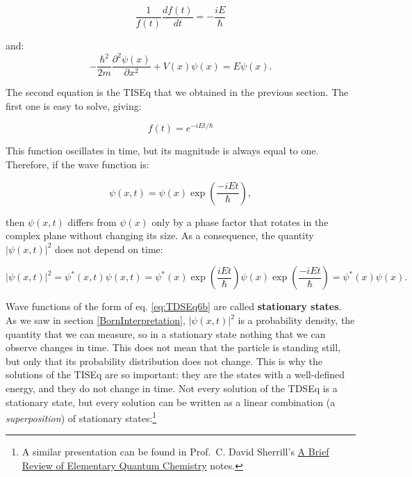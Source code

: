 \documentclass[
  english,
  9pt,
]{extbook}
\theoremstyle{definition}
\theoremstyle{definition}
\theoremstyle{definition}
\theoremstyle{definition}
\theoremstyle{remark}
\begin{document}
\begin{equation}
\frac{1}{f(t)} \frac{df(t)}{dt} = - \frac{i E}{\hbar}
\label{eq:TDSEq4}
\end{equation}

and:
\begin{equation}
-\frac{\hbar^2}{2m} \frac{\partial^2\psi(x)}{\partial x^2} + V(x) \psi(x) =
E \psi(x).
\label{eq:TDSEq5}
\end{equation}

The second equation is the TISEq that we obtained in the previous section. The first one is easy to solve, giving:

\begin{equation}
f(t) = e^{-iEt / \hbar}
\label{eq:TDSEq6}
\end{equation}

This function oscillates in time, but its magnitude is always equal to one. Therefore, if the wave function is:

\begin{equation}
\psi(x, t) = \psi(x) \exp\left(\frac{-iEt}{\hbar}\right),
\label{eq:TDSEq6b}
\end{equation}

then \(\psi(x, t)\) differs from \(\psi(x)\) only by a phase factor that rotates in the complex plane without changing its size. As a consequence, the quantity \(\vert \psi(x, t) \vert^2\) does not depend on time:

\begin{equation}
\vert \psi(x, t) \vert^2 = \psi^{*}(x, t) \psi(x, t)=
\psi^{*}(x)\exp\left(\frac{iEt}{\hbar}\right)\psi(x)\exp\left(\frac{-iEt}{\hbar}\right)= \psi^{*}(x) \psi(x).
\label{eq:TDSEq7}
\end{equation}

Wave functions of the form of eq. \eqref{eq:TDSEq6b} are called \textbf{stationary states}. As we saw in section \ref{BornInterpretation}, \(\vert \psi(x, t) \vert^2\) is a probability density, the quantity that we can measure, so in a stationary state nothing that we can observe changes in time. This does not mean that the particle is standing still, but only that its probability distribution does not change. This is why the solutions of the TISEq are so important: they are the states with a well-defined energy, and they do not change in time. Not every solution of the TDSEq is a stationary state, but every solution can be written as a linear combination (a \emph{superposition}) of stationary states:\footnote{A similar presentation can be found in Prof.~C. David Sherrill's \href{http://vergil.chemistry.gatech.edu/notes/quantrev/node1.html}{A Brief Review of Elementary Quantum Chemistry} notes.}
\end{document}
